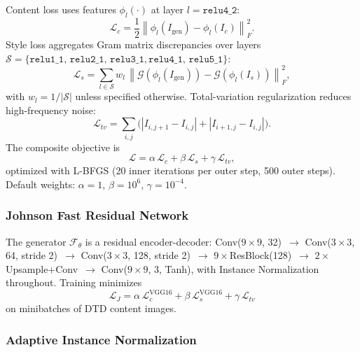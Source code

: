 \documentclass[conference]{IEEEtran}
\newcommand{\norm}[1]{\left\lVert#1\right\rVert}
\newcommand{\G}{\mathcal{G}}
\newcommand{\Lc}{\mathcal{L}_c}
\newcommand{\Ls}{\mathcal{L}_s}
\newcommand{\Ltv}{\mathcal{L}_{tv}}
\begin{document}
Content loss uses features $\phi_l(\cdot)$ at layer $l = \texttt{relu4\_2}$:
\begin{equation}
  \Lc = \frac{1}{2}\norm{\phi_l(I_{\text{gen}}) - \phi_l(I_c)}_F^2.
  \label{eq:content}
\end{equation}
Style loss aggregates Gram matrix discrepancies over layers
$\mathcal{S} = \{\texttt{relu1\_1},\,\texttt{relu2\_1},\,\texttt{relu3\_1},
\texttt{relu4\_1},\,\texttt{relu5\_1}\}$:
\begin{equation}
  \Ls = \sum_{l\in\mathcal{S}} w_l\,\norm{\G(\phi_l(I_{\text{gen}}))
        - \G(\phi_l(I_s))}_F^2,
  \label{eq:style}
\end{equation}
with $w_l = 1/|\mathcal{S}|$ unless specified otherwise.
Total-variation regularization reduces high-frequency noise:
\begin{equation}
  \Ltv = \sum_{i,j}\bigl(|I_{i,j+1}\!-I_{i,j}| + |I_{i+1,j}\!-I_{i,j}|\bigr).
  \label{eq:tv}
\end{equation}
The composite objective is
\begin{equation}
  \mathcal{L} = \alpha\,\Lc + \beta\,\Ls + \gamma\,\Ltv,
  \label{eq:total_loss}
\end{equation}
optimized with L-BFGS (20 inner iterations per outer step, 500 outer steps).
Default weights: $\alpha=1$, $\beta=10^6$, $\gamma=10^{-4}$.

\subsubsection{Johnson Fast Residual Network}

The generator $\mathcal{F}_\theta$ is a residual encoder-decoder:
Conv($9\times9$, 32)~$\to$ Conv($3\times3$, 64, stride 2)~$\to$
Conv($3\times3$, 128, stride 2)~$\to$ $9\times$ResBlock(128)~$\to$
$2\times$Upsample+Conv~$\to$ Conv($9\times9$, 3, Tanh),
with Instance Normalization \cite{b25} throughout. Training minimizes
\begin{equation}
  \mathcal{L}_J = \alpha\,\mathcal{L}_c^{\text{VGG16}}
    + \beta\,\mathcal{L}_s^{\text{VGG16}} + \gamma\,\Ltv
  \label{eq:johnson}
\end{equation}
on minibatches of DTD content images.

\subsubsection{Adaptive Instance Normalization}
\end{document}
